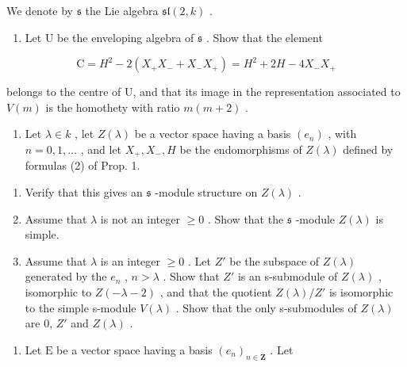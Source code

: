 
We denote by \(\mathfrak{s}\) the Lie algebra \(\mathfrak{sl}(2,k)\) .

\begin{enumerate}
\def\labelenumi{\arabic{enumi})}
\tightlist
\item
  Let \(\mathrm{U}\) be the enveloping algebra of \(\mathfrak{s}\) . Show that the element
\end{enumerate}

\[
\mathrm{C} = H ^ {2} - 2 (X _ {+} X _ {-} + X _ {-} X _ {+}) = H ^ {2} + 2 H - 4 X _ {-} X _ {+}
\]

belongs to the centre of U, and that its image in the representation associated to \(V(m)\) is the homothety with ratio \(m(m+2)\) .

\begin{enumerate}
\def\labelenumi{\arabic{enumi})}
\setcounter{enumi}{1}
\tightlist
\item
  Let \(\lambda \in k\) , let \(Z(\lambda)\) be a vector space having a basis \((e_n)\) , with \(n = 0,1,\ldots\) , and let \(X_{+}, X_{-}, H\) be the endomorphisms of \(Z(\lambda)\) defined by formulas (2) of Prop. 1.
\end{enumerate}

\begin{enumerate}
\def\labelenumi{\alph{enumi})}
\item
  Verify that this gives an \(\mathfrak{s}\) -module structure on \(Z(\lambda)\) .
\item
  Assume that \(\lambda\) is not an integer \(\geq 0\) . Show that the \(\mathfrak{s}\) -module \(Z(\lambda)\) is simple.
\item
  Assume that \(\lambda\) is an integer \(\geq 0\) . Let \(Z'\) be the subspace of \(Z(\lambda)\) generated by the \(e_{n}\) , \(n > \lambda\) . Show that \(Z'\) is an s-submodule of \(Z(\lambda)\) , isomorphic to \(Z(-\lambda - 2)\) , and that the quotient \(Z(\lambda)/Z'\) is isomorphic to the simple s-module \(V(\lambda)\) . Show that the only s-submodules of \(Z(\lambda)\) are 0, \(Z'\) and \(Z(\lambda)\) .
\end{enumerate}

\begin{enumerate}
\def\labelenumi{\arabic{enumi})}
\setcounter{enumi}{2}
\tightlist
\item
  Let \(\mathrm{E}\) be a vector space having a basis \((e_n)_{n\in \mathbf{Z}}\) . Let
\end{enumerate}

